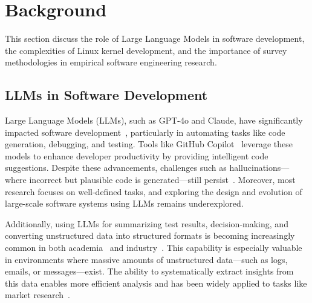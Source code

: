\documentclass[sigconf,review,anonymous]{acmart}
\begin{document}
\section{Background}
\label{sec:related}

This section discuss the role of Large Language Models in software development, the complexities of Linux kernel development, and the importance of survey methodologies in empirical software engineering research.

\subsection{LLMs in Software Development}

Large Language Models (LLMs), such as GPT-4o and Claude, have significantly impacted software development~\cite{jin2024llms}, particularly in automating tasks like code generation, debugging, and testing. Tools like GitHub Copilot~\cite{copilot} leverage these models to enhance developer productivity by providing intelligent code suggestions. Despite these advancements, challenges such as hallucinations—where incorrect but plausible code is generated—still persist~\cite{fan2023large,ji2023survey}. Moreover, most research focuses on well-defined tasks, and exploring the design and evolution of large-scale software systems using LLMs remains underexplored.

Additionally, using LLMs for summarizing test results, decision-making, and converting unstructured data into structured formats is becoming increasingly common in both academia~\cite{jin2024comprehensive,iourovitski2024grade,patel2024lotus} and industry~\cite{llmnvida}. This capability is especially valuable in environments where massive amounts of unstructured data—such as logs, emails, or messages—exist. The ability to systematically extract insights from this data enables more efficient analysis and has been widely applied to tasks like market research~\cite{brand2023using}.
\end{document}
